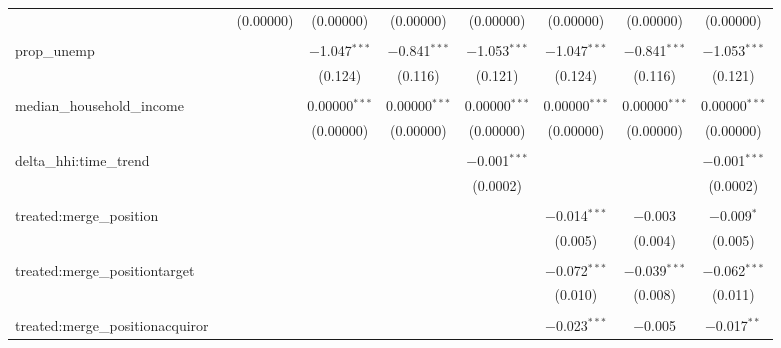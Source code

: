 \begin{table}[H]
{\begin{tabular}{@{\extracolsep{5pt}}lcccccccc}
   &  & (0.00000) & (0.00000) & (0.00000) & (0.00000) & (0.00000) & (0.00000) & (0.00000) \\  

   & & & & & & & & \\  

  prop\_unemp &  &  & $-$1.047$^{***}$ & $-$0.841$^{***}$ & $-$1.053$^{***}$ & $-$1.047$^{***}$ & $-$0.841$^{***}$ & $-$1.053$^{***}$ \\  

   &  &  & (0.124) & (0.116) & (0.121) & (0.124) & (0.116) & (0.121) \\  

   & & & & & & & & \\  

  median\_household\_income &  &  & 0.00000$^{***}$ & 0.00000$^{***}$ & 0.00000$^{***}$ & 0.00000$^{***}$ & 0.00000$^{***}$ & 0.00000$^{***}$ \\  

   &  &  & (0.00000) & (0.00000) & (0.00000) & (0.00000) & (0.00000) & (0.00000) \\  

   & & & & & & & & \\  

  delta\_hhi:time\_trend &  &  &  &  & $-$0.001$^{***}$ &  &  & $-$0.001$^{***}$ \\  

   &  &  &  &  & (0.0002) &  &  & (0.0002) \\  

   & & & & & & & & \\  

  treated:merge\_position &  &  &  &  &  & $-$0.014$^{***}$ & $-$0.003 & $-$0.009$^{*}$ \\  

   &  &  &  &  &  & (0.005) & (0.004) & (0.005) \\  

   & & & & & & & & \\  

  treated:merge\_positiontarget &  &  &  &  &  & $-$0.072$^{***}$ & $-$0.039$^{***}$ & $-$0.062$^{***}$ \\  

   &  &  &  &  &  & (0.010) & (0.008) & (0.011) \\  

   & & & & & & & & \\  

  treated:merge\_positionacquiror &  &  &  &  &  & $-$0.023$^{***}$ & $-$0.005 & $-$0.017$^{**}$ \\  


\end{tabular}}
\end{table}

